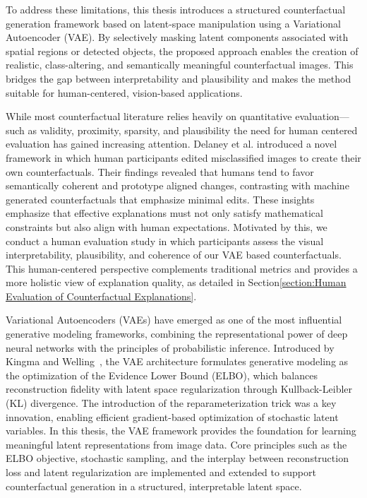To address these limitations, this thesis introduces a structured counterfactual generation framework based on latent-space manipulation using a Variational Autoencoder (VAE). By selectively masking latent components associated with spatial regions or detected objects, the proposed approach enables the creation of realistic, class-altering, and semantically meaningful counterfactual images. This bridges the gap between interpretability and plausibility and makes the method suitable for human-centered, vision-based applications.

While most counterfactual literature relies heavily on quantitative evaluation—such as validity, proximity, sparsity, and plausibility the need for human centered evaluation has gained increasing attention. Delaney et al.\cite{DELANEY2023103995} introduced a novel framework in which human participants edited misclassified images to create their own counterfactuals. Their findings revealed that humans tend to favor semantically coherent and prototype aligned changes, contrasting with machine generated counterfactuals that emphasize minimal edits. These insights emphasize that effective explanations must not only satisfy mathematical constraints but also align with human expectations. Motivated by this, we conduct a human evaluation study in which participants assess the visual interpretability, plausibility, and coherence of our VAE based counterfactuals. This human-centered perspective complements traditional metrics and provides a more holistic view of explanation quality, as detailed in Section\ref{section:Human Evaluation of Counterfactual Explanations}.


Variational Autoencoders (VAEs) have emerged as one of the most influential generative modeling frameworks, combining the representational power of deep neural networks with the principles of probabilistic inference. Introduced by Kingma and Welling~\cite{Kingma_2019}, the VAE architecture formulates generative modeling as the optimization of the Evidence Lower Bound (ELBO), which balances reconstruction fidelity with latent space regularization through Kullback-Leibler (KL) divergence. The introduction of the reparameterization trick was a key innovation, enabling efficient gradient-based optimization of stochastic latent variables. In this thesis, the VAE framework provides the foundation for learning meaningful latent representations from image data. Core principles such as the ELBO objective, stochastic sampling, and the interplay between reconstruction loss and latent regularization are implemented and extended to support counterfactual generation in a structured, interpretable latent space.

